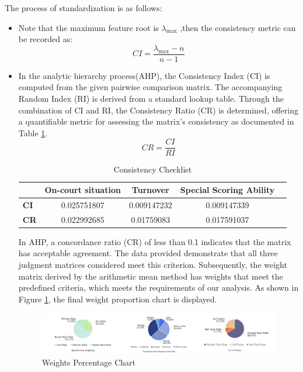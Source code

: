 The process of standardization is as follows:
\begin{itemize}
    \item Note that the maximum feature root is $\lambda_{\text{max}}$ ,then the consistency metric can be recorded as:
    \begin{equation}
        CI = \frac{\lambda_{\text{max}} - n}{n - 1}
    \end{equation}
    \item In the analytic hierarchy process(AHP), the Consistency Index (CI) is computed from the given pairwise comparison matrix. The accompanying Random Index (RI) is derived from a standard lookup table. Through the combination of CI and RI, the Consistency Ratio (CR) is determined, offering a quantifiable metric for assessing the matrix’s consistency as documented in Table \ref{tab:TCC}.
    \begin{equation}
        CR = \frac{CI}{RI}
    \end{equation}
    \begin{table}[!bt]
    \centering
    \caption{\centering Consistency Checklist} 
    \label{tab:TCC}
    \begin{tabular}{@{}lcccc@{}} %
        \toprule
        & \textbf{On-court situation} & \textbf{Turnover} & \textbf{Special Scoring Ability}  \\
        \midrule
        \textbf{CI} & 0.025751807 & 0.009147232 & 0.009147339 \\
        \textbf{CR} & 0.022992685 & 0.01759083 & 0.017591037  \\
        \bottomrule
    \end{tabular}
    
\end{table}


In AHP, a concordance ratio (CR) of less than 0.1 indicates that the matrix has acceptable agreement. The data provided demonstrate that all three judgment matrices considered meet this criterion. Subsequently, the weight matrix derived by the arithmetic mean method has weights that meet the predefined criteria, which meets the requirements of our analysis. As shown in Figure \ref{fig:WPC}, the final weight proportion chart is displayed.
\begin{figure}
    \centering
    \includegraphics[width=1\linewidth]{figure/Percentage Map.jpg}
    \caption{\centering Weights Percentage Chart}
    \label{fig:WPC}
\end{figure}


\end{itemize}

